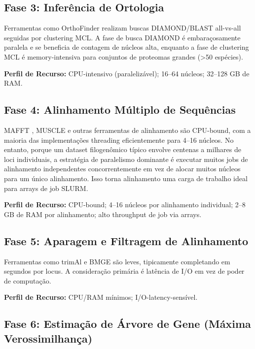 \subsection{Fase 3: Inferência de Ortologia}

Ferramentas como OrthoFinder \parencite{emms2019} realizam buscas DIAMOND/BLAST all-vs-all seguidas por clustering MCL. A fase de busca DIAMOND é embaraçosamente paralela e se beneficia de contagem de núcleos alta, enquanto a fase de clustering MCL é memory-intensiva para conjuntos de proteomas grandes (>50 espécies).

\textbf{Perfil de Recurso:} CPU-intensivo (paralelizável); 16--64 núcleos; 32--128 GB de RAM.

\subsection{Fase 4: Alinhamento Múltiplo de Sequências}

MAFFT \parencite{katoh2013}, MUSCLE e outras ferramentas de alinhamento são CPU-bound, com a maioria das implementações threading eficientemente para 4--16 núcleos. No entanto, porque um dataset filogenômico típico envolve centenas a milhares de loci individuais, a estratégia de paralelismo dominante é executar muitos jobs de alinhamento independentes concorrentemente em vez de alocar muitos núcleos para um único alinhamento. Isso torna alinhamento uma carga de trabalho ideal para arrays de job SLURM.

\textbf{Perfil de Recurso:} CPU-bound; 4--16 núcleos por alinhamento individual; 2--8 GB de RAM por alinhamento; alto throughput de job via arrays.

\subsection{Fase 5: Aparagem e Filtragem de Alinhamento}

Ferramentas como trimAl \parencite{capella2009} e BMGE \parencite{criscuolo2010} são leves, tipicamente completando em segundos por locus. A consideração primária é latência de I/O em vez de poder de computação.

\textbf{Perfil de Recurso:} CPU/RAM mínimos; I/O-latency-sensível.

\subsection{Fase 6: Estimação de Árvore de Gene (Máxima Verossimilhança)}

